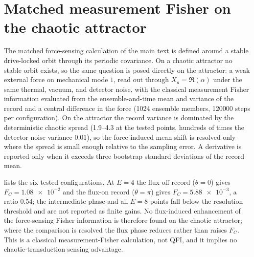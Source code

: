 \documentclass[Phys]{SciPost}
\begin{document}
\section{Matched measurement Fisher on the chaotic attractor}
\label{SI-sec:attractor-fisher}
\label{SI-sec:attractor-fisher}

The matched force-sensing calculation of the main text is defined around a
stable drive-locked orbit through its periodic covariance. On a chaotic
attractor no stable orbit exists, so the same question is posed directly on the
attractor: a weak external force on mechanical mode $1$, read out through
$X_a=\Re(\alpha)$ under the same thermal, vacuum, and detector noise, with the
classical measurement Fisher information evaluated from the ensemble-and-time
mean and variance of the record and a central difference in the force
(\num{1024} ensemble members, \num{120000} steps per configuration). On the
attractor the record variance is dominated by the deterministic chaotic spread
(\num{1.9}--\num{4.3} at the tested points, hundreds of times the detector-noise
variance \num{0.01}), so the force-induced mean shift is resolved only where the
spread is small enough relative to the sampling error. A derivative is reported
only when it exceeds three bootstrap standard deviations of the record mean.

 lists the six tested configurations. At
$E=\num{4}$ the flux-off record ($\theta=0$) gives
$F_C=\num{1.08e-2}$ and the flux-on record ($\theta=\pi$) gives
$F_C=\num{5.88e-3}$, a ratio \num{0.54}; the intermediate phase and all
$E=\num{8}$ points fall below the resolution threshold and are not reported as
finite gains. No flux-induced enhancement of the force-sensing Fisher
information is therefore found on the chaotic attractor; where the comparison
is resolved the flux phase reduces rather than raises $F_C$. This is a
classical measurement-Fisher calculation, not QFI, and it implies no
chaotic-transduction sensing advantage.
\end{document}

